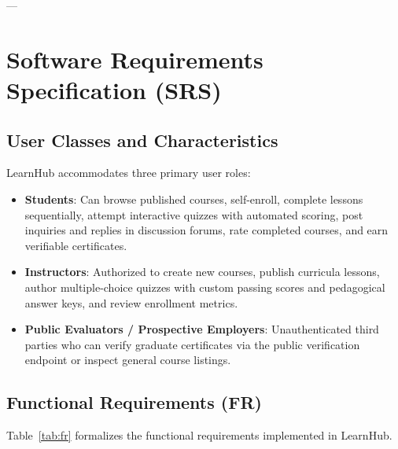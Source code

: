 \documentclass[12pt,a4paper]{report}
\begin{document}
---

\chapter{Software Requirements Specification (SRS)}

\section{User Classes and Characteristics}
LearnHub accommodates three primary user roles:
\begin{itemize}[itemsep=4pt]
    \item \textbf{Students}: Can browse published courses, self-enroll, complete lessons sequentially, attempt interactive quizzes with automated scoring, post inquiries and replies in discussion forums, rate completed courses, and earn verifiable certificates.
    \item \textbf{Instructors}: Authorized to create new courses, publish curricula lessons, author multiple-choice quizzes with custom passing scores and pedagogical answer keys, and review enrollment metrics.
    \item \textbf{Public Evaluators / Prospective Employers}: Unauthenticated third parties who can verify graduate certificates via the public verification endpoint or inspect general course listings.
\end{itemize}

\section{Functional Requirements (FR)}
Table~\ref{tab:fr} formalizes the functional requirements implemented in LearnHub.
\end{document}
